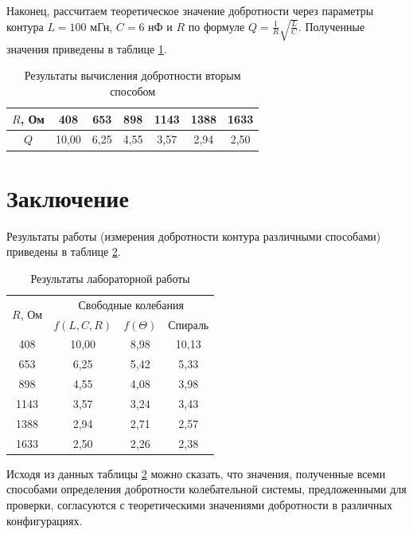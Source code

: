 \documentclass[a4paper, 12pt]{article}
\begin{document}
    Наконец, рассчитаем теоретическое значение добротности через параметры контура $L = 100$ мГн, $C = 6$ нФ и $R$ по формуле $Q  = \frac{1}{R} \sqrt{\frac{L}{C}}$. Полученные значения приведены в таблице \ref{table:Q_3}.

     \begin{table}[H]
        \centering
        \begin{tabular}{|c|c|c|c|c|c|c|}
        \hline
        $R$, Ом & 408 & 653 & 898 & 1143 & 1388 & 1633 \\ \hline
        $Q$ & 10,00 & 6,25 & 4,55 & 3,57 & 2,94 & 2,50 \\ \hline
        \end{tabular}
        \caption{Результаты вычисления добротности вторым способом}
        \label{table:Q_3}
    \end{table}

    \section{Заключение}

    Результаты работы (измерения добротности контура различными способами) приведены в таблице \ref{table:final}.

    \begin{table}[H]
        \centering
        \begin{tabular}{|c|ccc|}
        \hline
        \multirow{2}{*}{$R$, Ом} & \multicolumn{3}{c|}{Свободные колебания} \\ \cline{2-4} 
         & \multicolumn{1}{c|}{$f(L, C, R)$} & \multicolumn{1}{c|}{$f(\Theta)$} & Спираль \\ \hline
        408 & \multicolumn{1}{c|}{10,00} & \multicolumn{1}{c|}{8,98} & 10,13 \\ \hline
        653 & \multicolumn{1}{c|}{6,25} & \multicolumn{1}{c|}{5,42} & 5,33 \\ \hline
        898 & \multicolumn{1}{c|}{4,55} & \multicolumn{1}{c|}{4,08} & 3,98 \\ \hline
        1143 & \multicolumn{1}{c|}{3,57} & \multicolumn{1}{c|}{3,24} & 3,43 \\ \hline
        1388 & \multicolumn{1}{c|}{2,94} & \multicolumn{1}{c|}{2,71} & 2,57 \\ \hline
        1633 & \multicolumn{1}{c|}{2,50} & \multicolumn{1}{c|}{2,26} & 2,38 \\ \hline
        \end{tabular}
        \caption{Результаты лабораторной работы}
        \label{table:final}
    \end{table}

    Исходя из данных таблицы \ref{table:final} можно сказать, что значения, полученные всеми способами определения добротности колебательной системы, предложенными для проверки, согласуются с теоретическими значениями добротности в различных конфигурациях.
\end{document}
